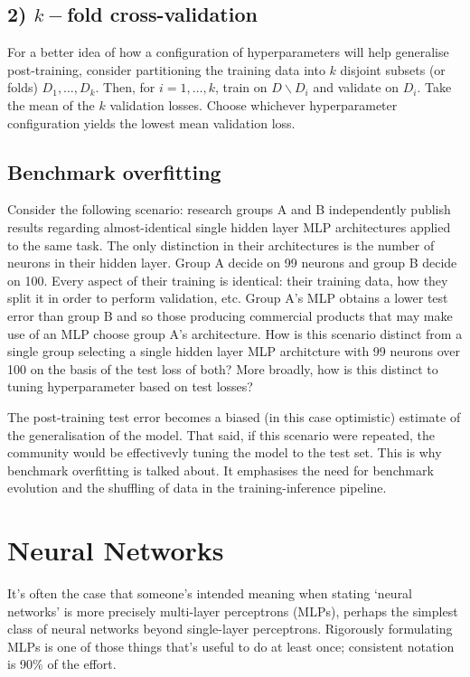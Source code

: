 \documentclass[11pt]{article}
\begin{document}
\subsection*{2) $k-$fold cross-validation}
For a better idea of how a configuration of hyperparameters will help generalise post-training, consider partitioning the training data into $k$ disjoint subsets (or folds) $D_1,\dots,D_k$. Then, for $i=1,\dots,k$, train on $D\backslash D_i$ and validate on $D_i$. Take the mean of the $k$ validation losses. Choose whichever hyperparameter configuration yields the lowest mean validation loss.

\subsection*{Benchmark overfitting}
Consider the following scenario: research groups A and B independently publish results regarding almost-identical single hidden layer MLP architectures applied to the same task. The only distinction in their architectures is the number of neurons in their hidden layer. Group A decide on 99 neurons and group B decide on 100. Every aspect of their training is identical: their training data, how they split it in order to perform validation, etc. Group A's MLP obtains a lower test error than group B and so those producing commercial products that may make use of an MLP choose group A's architecture. How is this scenario distinct from a single group selecting a single hidden layer MLP architcture with 99 neurons over 100 on the basis of the test loss of both? More broadly, how is this distinct to tuning hyperparameter based on test losses?

The post-training test error becomes a biased (in this case optimistic) estimate of the generalisation of the model. That said, if this scenario were repeated, the community would be effectivevly tuning the model to the test set. This is why benchmark overfitting is talked about. It emphasises the need for benchmark evolution and the shuffling of data in the training-inference pipeline.

\section{Neural Networks}
It's often the case that someone's intended meaning when stating `neural networks' is more precisely multi-layer perceptrons (MLPs), perhaps the simplest class of neural networks beyond single-layer perceptrons. Rigorously formulating MLPs is one of those things that's useful to do at least once; consistent notation is 90\% of the effort.
\end{document}

